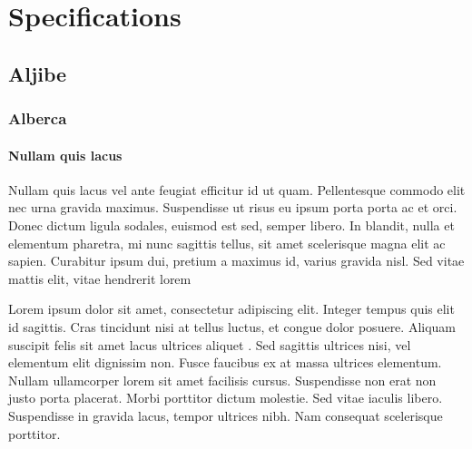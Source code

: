 % 
% 
% 



\clearpage
\cleardoublepage

\chapter{Specifications}

\section{Aljibe}

\subsection{Alberca}

\subsubsection{Nullam quis lacus}

Nullam quis lacus vel ante feugiat efficitur id ut quam. Pellentesque commodo elit nec urna gravida maximus. Suspendisse ut risus eu ipsum porta porta ac et orci. Donec dictum ligula sodales, euismod est sed, semper libero. In blandit, nulla et elementum pharetra, mi nunc sagittis tellus, sit amet scelerisque magna elit ac sapien. Curabitur ipsum dui, pretium a maximus id, varius gravida nisl. Sed vitae mattis elit, vitae hendrerit lorem

Lorem ipsum dolor sit amet, consectetur adipiscing elit. Integer tempus quis elit id sagittis. Cras tincidunt nisi at tellus luctus, et congue dolor posuere. Aliquam suscipit felis sit amet lacus ultrices aliquet . Sed sagittis ultrices nisi, vel elementum elit dignissim non. Fusce faucibus ex at massa ultrices elementum. Nullam ullamcorper lorem sit amet facilisis cursus. Suspendisse non erat non justo porta placerat. Morbi porttitor dictum molestie. Sed vitae iaculis libero. Suspendisse in gravida lacus, tempor ultrices nibh. Nam consequat scelerisque porttitor.

